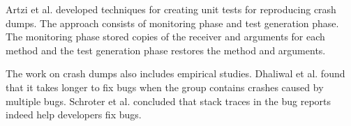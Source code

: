 Artzi et al. \cite{Artzi:2008} developed techniques for creating unit tests for reproducing crash dumps. The approach consists of monitoring phase and test generation phase. The monitoring phase stored copies of the receiver and arguments for each method and the test generation phase restores the method and arguments.

The work on crash dumps also includes empirical studies. Dhaliwal et al.\cite{6080800} found that it takes longer to fix bugs when the group contains crashes caused by multiple bugs. Schroter \cite{5463280} et al. concluded that stack traces in the bug reports indeed help developers fix bugs. 


